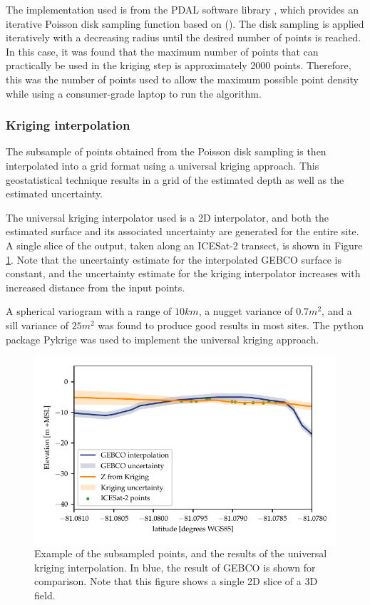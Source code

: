 The implementation used is from the PDAL software library \parencite{howard_butler_2022_6369164}, which provides an iterative Poisson disk sampling function based on \citeauthor{McCool1992} (\citeyear{McCool1992}). The disk sampling is applied iteratively with a decreasing radius until the desired number of points is reached. In this case, it was found that the maximum number of points that can practically be used in the kriging step is approximately 2000 points. Therefore, this was the number of points used to allow the maximum possible point density while using a consumer-grade laptop to run the algorithm. 

\subsubsection{Kriging interpolation}
The subsample of points obtained from the Poisson disk sampling is then interpolated into a grid format using a universal kriging approach. This geostatistical technique results in a grid of the estimated depth as well as the estimated uncertainty. 

The universal kriging interpolator used is a 2D interpolator, and both the estimated surface and its associated uncertainty are generated for the entire site. A single slice of the output, taken along an ICESat-2 transect, is shown in Figure \ref{fig:kriging-interpolator}. Note that the uncertainty estimate for the interpolated GEBCO surface is constant, and the uncertainty estimate for the kriging interpolator increases with increased distance from the input points. 

A spherical variogram with a range of $10 km$, a nugget variance of $0.7 m^2$, and a sill variance of $25 m^2$ was found to produce good results in most sites. The python package Pykrige \parencite{benjamin_murphy_2021_5380342} was used to implement the universal kriging approach. 

\begin{figure}[!ht]
    \centering
    \includegraphics[]{figures/methodology-kriging-output.pdf}
    \caption[2D Slice of universal kriging process inputs and outputs]{Example of the subsampled points, and the results of the universal kriging interpolation. In blue, the result of GEBCO is shown for comparison. Note that this figure shows a single 2D slice of a 3D field.}
    \label{fig:kriging-interpolator}
\end{figure}


